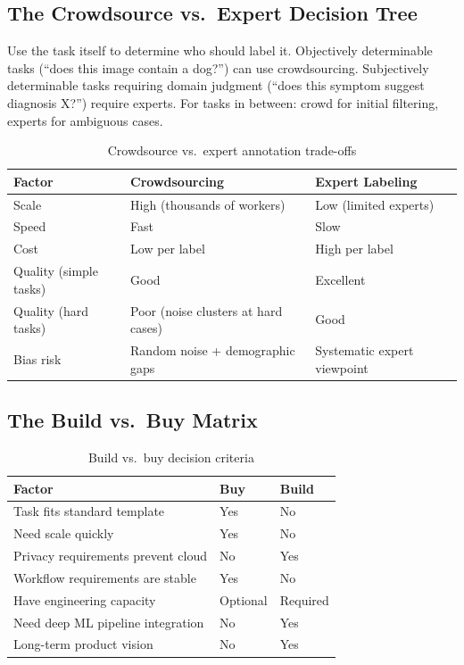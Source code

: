 \subsection{The Crowdsource vs.\ Expert Decision Tree}

\begin{keyconcept}
Use the task itself to determine who should label it. Objectively determinable tasks (``does this image contain a dog?'') can use crowdsourcing. Subjectively determinable tasks requiring domain judgment (``does this symptom suggest diagnosis X?'') require experts. For tasks in between: crowd for initial filtering, experts for ambiguous cases.
\end{keyconcept}

\begin{table}[htbp]
\caption{Crowdsource vs.\ expert annotation trade-offs}
\label{tab:crowd-vs-expert}
\centering
\begin{tabular}{@{}p{3cm}p{3.5cm}p{3.5cm}@{}}
\toprule
\textbf{Factor} & \textbf{Crowdsourcing} & \textbf{Expert Labeling} \\
\midrule
Scale & High (thousands of workers) & Low (limited experts) \\
Speed & Fast & Slow \\
Cost & Low per label & High per label \\
Quality (simple tasks) & Good & Excellent \\
Quality (hard tasks) & Poor (noise clusters at hard cases) & Good \\
Bias risk & Random noise + demographic gaps & Systematic expert viewpoint \\
\bottomrule
\end{tabular}
\end{table}

\subsection{The Build vs.\ Buy Matrix}

\begin{table}[htbp]
\caption{Build vs.\ buy decision criteria}
\label{tab:build-vs-buy}
\centering
\begin{tabular}{@{}p{5cm}p{2.5cm}p{2.5cm}@{}}
\toprule
\textbf{Factor} & \textbf{Buy} & \textbf{Build} \\
\midrule
Task fits standard template & Yes & No \\
Need scale quickly & Yes & No \\
Privacy requirements prevent cloud & No & Yes \\
Workflow requirements are stable & Yes & No \\
Have engineering capacity & Optional & Required \\
Need deep ML pipeline integration & No & Yes \\
Long-term product vision & No & Yes \\
\bottomrule
\end{tabular}
\end{table}

